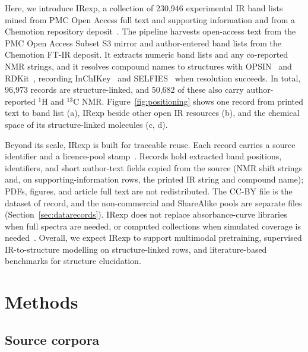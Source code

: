 \documentclass[pdflatex,sn-nature]{sn-jnl}
\begin{document}
Here, we introduce IRexp, a collection of 230,946 experimental IR band lists mined from
PMC Open Access full text and supporting information and from a Chemotion repository
deposit~\citep{tremouilhac2017chemotion,tremouilhac2020chemotionrepo,chemotion2024}.
The pipeline harvests open-access text from the PMC Open Access Subset S3 mirror and
author-entered band lists from the Chemotion FT-IR deposit.
It extracts numeric band lists and any co-reported NMR strings, and it resolves compound
names to structures with OPSIN~\citep{lowe2011opsin} and RDKit~\citep{landrum_rdkit},
recording InChIKey~\citep{heller2013inchi} and SELFIES~\citep{krenn2020selfies} when
resolution succeeds.
In total, 96,973 records are structure-linked, and 50,682 of these also carry
author-reported $^{1}$H and $^{13}$C NMR.
Figure~\ref{fig:positioning} shows one record from printed text to band list (a),
IRexp beside other open IR resources (b), and the chemical space of its
structure-linked molecules (c, d).

Beyond its scale, IRexp is built for traceable reuse.
Each record carries a source identifier and a licence-pool
stamp~\citep{hrynaszkiewicz2012open,carroll2011openaccess}.
Records hold extracted band positions, identifiers, and short author-text fields
copied from the source (NMR shift strings and, on supporting-information rows, the
printed IR string and compound name); PDFs, figures, and article full text are not
redistributed.
The CC-BY file is the dataset of record, and the non-commercial and ShareAlike pools
are separate files (Section~\ref{sec:datarecords}).
IRexp does not replace absorbance-curve libraries when full spectra are needed, or
computed collections when simulated coverage is needed~\citep{zipoli2025uspto}.
Overall, we expect IRexp to support multimodal pretraining, supervised IR-to-structure
modelling on structure-linked rows, and literature-based benchmarks for structure
elucidation.

\section{Methods}\label{sec:methods}

\subsection{Source corpora}
\end{document}
